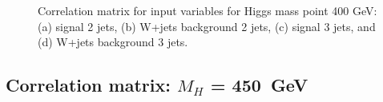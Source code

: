 \begin{figure}[bthp!]
\caption{\label{fig:FigCorr400Mu} 
Correlation matrix for input variables for Higgs mass point 400 GeV:
(a) signal 2 jets, (b) W+jets background 2 jets, 
(c) signal 3 jets, and (d) W+jets background 3 jets.
}
\end{figure}
\newpage
\subsection{Correlation matrix: \texorpdfstring{$M_H$}{M(H)} = 450~GeV}
\begin{figure}[bthp!]
\vspace*{1mm} \\
\end{figure}
